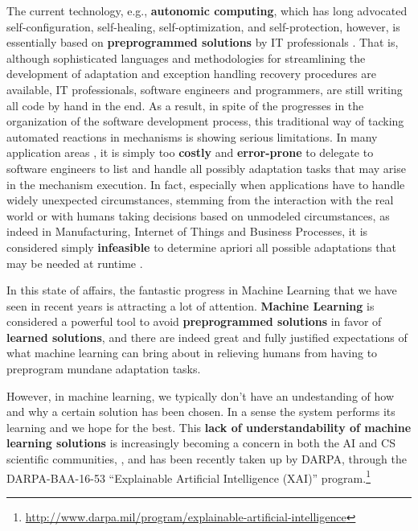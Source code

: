 The current technology, e.g., \textbf{autonomic computing}, which has
long advocated self-configuration, self-healing, self-optimization,
and self-protection, however, is essentially based on
\textbf{preprogrammed solutions} by IT professionals
\cite{ibm2005autonomic}. That is, although sophisticated languages and
methodologies for streamlining 
the development of
adaptation and exception
handling recovery procedures are available\cite{???}, IT
professionals, software engineers and programmers, are still writing
all code by hand in the end.
As a result, in spite of the progresses in the organization of the
software development process, this traditional way of tacking
automated reactions in mechanisms is showing serious limitations.
In many application areas , it is simply
too \textbf{costly} and
\textbf{error-prone} to delegate to software engineers to list and
handle all possibly adaptation tasks that may arise in the mechanism
execution.
In fact, especially when applications have to handle widely unexpected
circumstances, stemming from the interaction with the real world or with humans taking decisions based on unmodeled circumstances, as indeed in
Manufacturing,  Internet of Things and Business Processes, it is
considered simply \textbf{infeasible} to determine apriori all
possible adaptations that may be needed at runtime
\cite{MarrellaMS17}.

In this state of affairs, %
the fantastic 
progress
in Machine Learning that we 
have seen in recent years
is attracting a lot of attention. \textbf{Machine Learning} is
considered  a powerful tool to avoid \textbf{preprogrammed solutions} %
in favor of \textbf{learned solutions}, and 
there are indeed great and fully justified expectations %
of what machine learning can bring about in relieving 
humans from having to preprogram
mundane adaptation tasks.

However, in machine learning, we typically don't have an undestanding
of %
how and why a certain solution has been chosen. In a sense the system
performs its learning and 
we %
hope for the best. This 
\textbf{lack of understandability of machine learning solutions} 
is increasingly becoming a concern in both the AI and CS scientific communities,
\cite{RussellDT15,ACMStatement07}, and has been recently taken up by DARPA, through the DARPA-BAA-16-53 ``Explainable
Artificial Intelligence (XAI)''
program.\footnote{\url{http://www.darpa.mil/program/explainable-artificial-intelligence}}

